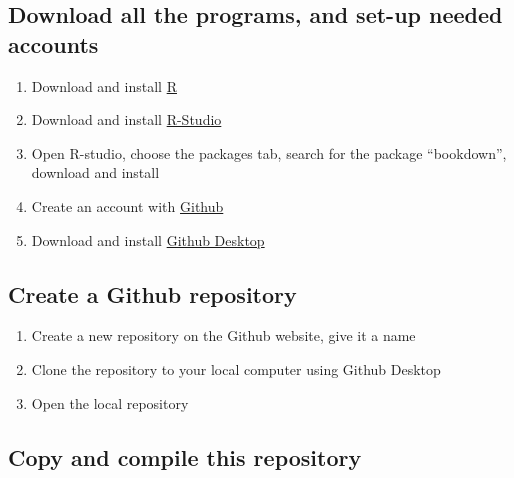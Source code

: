 \documentclass[
]{book}
\providecommand{\tightlist}{%
  \setlength{\itemsep}{0pt}\setlength{\parskip}{0pt}}
\begin{document}
\hypertarget{download-all-the-programs-and-set-up-needed-accounts}{%
\subsection{Download all the programs, and set-up needed accounts}\label{download-all-the-programs-and-set-up-needed-accounts}}

\begin{enumerate}
\def\labelenumi{\arabic{enumi}.}
\tightlist
\item
  Download and install \href{https://www.r-project.org}{R}
\item
  Download and install \href{https://www.rstudio.com}{R-Studio}
\item
  Open R-studio, choose the packages tab, search for the package ``bookdown'', download and install
\item
  Create an account with \href{http://www.github.com}{Github}
\item
  Download and install \href{(https://desktop.github.com)}{Github Desktop}
\end{enumerate}

\hypertarget{create-a-github-repository}{%
\subsection{Create a Github repository}\label{create-a-github-repository}}

\begin{enumerate}
\def\labelenumi{\arabic{enumi}.}
\setcounter{enumi}{5}
\tightlist
\item
  Create a new repository on the Github website, give it a name
\item
  Clone the repository to your local computer using Github Desktop
\item
  Open the local repository
\end{enumerate}

\hypertarget{copy-and-compile-this-repository}{%
\subsection{Copy and compile this repository}\label{copy-and-compile-this-repository}}
\end{document}
